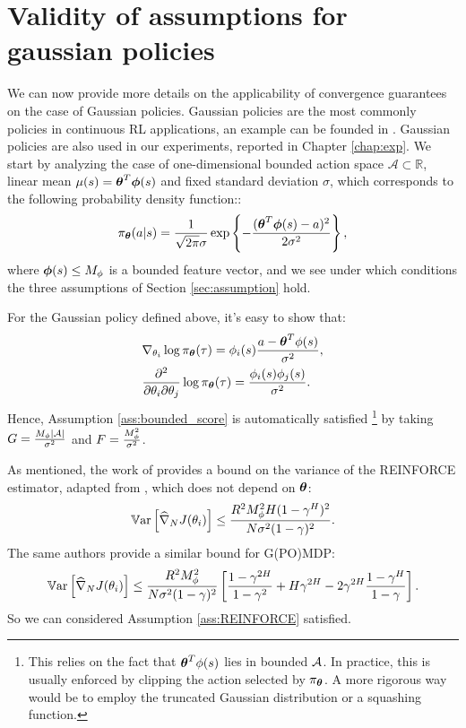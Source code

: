 \section{Validity of assumptions for gaussian policies}\label{sec:gaussianassumption}
We can now provide more details on the applicability of convergence guarantees on the case of Gaussian policies. Gaussian policies are the most commonly policies in continuous RL applications, an example can be founded in \cite{kober2013reinforcement}. Gaussian policies are also used in our experiments, reported in Chapter \ref{chap:exp}. We start by analyzing the case of one-dimensional bounded action space $\mathcal{A}\subset\mathbb{R}$, linear mean $\mu(s) = \vtheta^T\vphi(s)$ and fixed standard deviation $\sigma$, which corresponds to the following probability density function::
\[
\pi_{\vtheta}(a\vert s) = \frac{1}{\sqrt{2\pi}\sigma}\exp\left\{
-\frac{(\vtheta^T\vphi(s) - a)^2}{2\sigma^2}\right\},
\]
where $\vphi(s)\leq M_{\phi}$ is a bounded feature vector, and we see under which conditions the three assumptions of Section \ref{sec:assumption} hold.

For the Gaussian policy defined above, it's easy to show that:
\begin{align*}
&\nabla_{\theta_i}\log\pi_{\vtheta}(\tau) =  \phi_i(s)\frac{a-\vtheta^T\phi(s)}{\sigma^2},\\
&\frac{\partial^2}{\partial\theta_i\partial\theta_j}\log\pi_{\vtheta}(\tau) = \frac{\phi_i(s)\phi_j(s)}{\sigma^2}.
\end{align*}
Hence, Assumption \ref{ass:bounded_score} is automatically satisfied \footnote{This relies on the fact that $\vtheta^T\phi(s)$ lies in bounded $\Aspace$. In practice, this is usually enforced by clipping the action selected by $\pi_{\vtheta}$. A more rigorous way would be to employ the truncated Gaussian distribution or a squashing function.} by taking $\GRADLOG = \frac{M_{\phi}|\Aspace|}{\sigma^2}$ and $\HESSLOG = \frac{M_{\phi}^2}{\sigma^2}$.
\par

As mentioned, the work of \cite{pirotta2013adaptive} provides a bound on the variance of the REINFORCE estimator, adapted from \cite{zhao2011analysis}, which does not depend on $\vtheta$:
\begin{align*}
\Var\left[\gradApp{\theta_i}{N}\right] \leq \frac{R^2M_{\phi}^2H(1-\gamma^H)^2}{N\sigma^2(1-\gamma)^2}.
\end{align*}
The same authors provide a similar bound for G(PO)MDP:
\begin{align*}
\Var\left[\gradApp{\theta_i}{N}\right] \leq \frac{R^2M_{\phi}^2}{N\sigma^2(1-\gamma)^2}\left[
 \frac{1-\gamma^{2H}}{1-\gamma^2} + H\gamma^{2H} - 2\gamma^{2H}\frac{1-\gamma^{H}}{1-\gamma} \right].
\end{align*}
 So we can considered Assumption \ref{ass:REINFORCE} satisfied.


